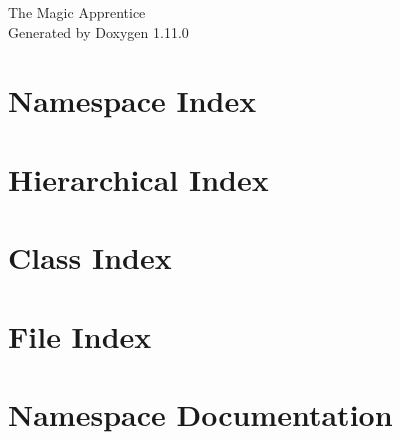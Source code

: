 \documentclass[twoside]{book}
\newcommand{\+}{\discretionary{\mbox{\scriptsize$\hookleftarrow$}}{}{}}
\newcommand{\clearemptydoublepage}{%
    \newpage{\pagestyle{empty}\cleardoublepage}%
  }
\begin{document}
  \raggedbottom
    \hypersetup{pageanchor=false,
                bookmarksnumbered=true,
                pdfencoding=unicode
               }
  \begin{titlepage}
  \vspace*{7cm}
  \begin{center}%
  {\Large The Magic Apprentice}\\
  \vspace*{1cm}
  {\large Generated by Doxygen 1.11.0}\\
  \end{center}
  \end{titlepage}
  \clearemptydoublepage
  \tableofcontents
  \clearemptydoublepage
  \hypersetup{pageanchor=true}

\chapter{Namespace Index}

\chapter{Hierarchical Index}

\chapter{Class Index}

\chapter{File Index}

\chapter{Namespace Documentation}

\end{document}
